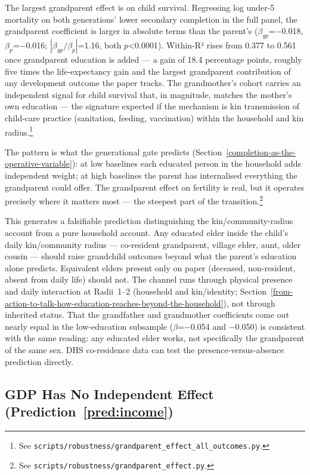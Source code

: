 \documentclass[12pt,letterpaper]{article}
\begin{document}
The largest grandparent effect is on child survival. Regressing log
under-5 mortality on both generations' lower secondary completion in
the full panel, the grandparent coefficient is larger in absolute
terms than the parent's ($\beta_{gp}$=$-$0.018, $\beta_p$=$-$0.016;
$|\beta_{gp}/\beta_p|$=1.16, both $p$\textless0.0001). Within-R² rises
from 0.377 to 0.561 once grandparent education is added --- a gain of
18.4 percentage points, roughly five times the life-expectancy gain
and the largest grandparent contribution of any development outcome
the paper tracks. The grandmother's cohort carries an independent
signal for child survival that, in magnitude, matches the mother's
own education --- the signature expected if the mechanism is kin
transmission of child-care practice (sanitation, feeding,
vaccination) within the household and kin radius.\footnote{See
\texttt{scripts/robustness/grandparent\_effect\_all\_outcomes.py}.}

The pattern is what the generational gate predicts
(Section~\ref{completion-as-the-operative-variable}): at low baselines
each educated person in the household adds independent weight; at high
baselines the parent has internalised everything the grandparent could
offer. The grandparent effect on fertility is real, but it operates
precisely where it matters most --- the steepest part of the
transition.\footnote{See
\texttt{scripts/robustness/grandparent\_effect.py}.}

This generates a falsifiable prediction distinguishing the
kin/community-radius account from a pure household account. Any educated elder inside
the child's daily kin/community radius --- co-resident grandparent,
village elder, aunt, older cousin --- should raise grandchild outcomes
beyond what the parent's education alone predicts. Equivalent
elders present only on paper (deceased, non-resident, absent from daily
life) should not. The channel runs through physical presence and daily
interaction at Radii~1--2 (household and kin/identity;
Section~\ref{from-action-to-talk-how-education-reaches-beyond-the-household}),
not through inherited status. That the grandfather and grandmother
coefficients come out nearly equal in the low-education subsample
($\beta$=$-$0.054 and $-$0.050) is consistent with the same reading: any
educated elder works, not specifically the grandparent of the same
sex. DHS co-residence data can test the presence-versus-absence
prediction directly.

\subsection{GDP Has No Independent Effect (Prediction~\ref{pred:income})}\label{gdp-has-no-independent-effect}
\end{document}
